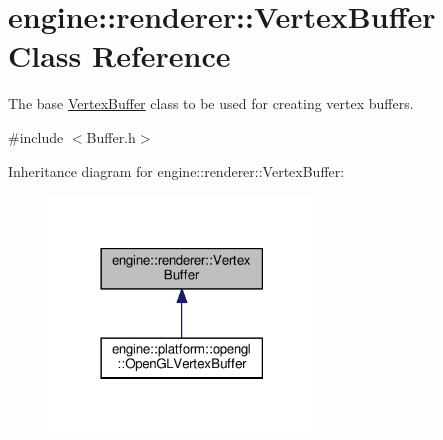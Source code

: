 \hypertarget{classengine_1_1renderer_1_1VertexBuffer}{}\section{engine\+:\+:renderer\+:\+:Vertex\+Buffer Class Reference}
\label{classengine_1_1renderer_1_1VertexBuffer}


The base \hyperlink{classengine_1_1renderer_1_1VertexBuffer}{Vertex\+Buffer} class to be used for creating vertex buffers.  




{\ttfamily \#include $<$Buffer.\+h$>$}



Inheritance diagram for engine\+:\+:renderer\+:\+:Vertex\+Buffer\+:\nopagebreak
\begin{figure}[H]
\begin{center}
\leavevmode
\includegraphics[width=201pt]{classengine_1_1renderer_1_1VertexBuffer__inherit__graph}
\end{center}
\end{figure}
